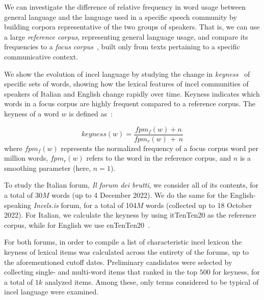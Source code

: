 \documentclass[11pt]{article}
\newcommand{\todoA}[1]{\todo[color=blue!40]{A: #1}}
\begin{document}

We can investigate the difference of relative frequency in word usage between general language and the language used in a specific speech community by building corpora representative of the two groups of speakers. That is, we can use a large \textit{reference corpus},
representing general language usage, and compare its frequencies to a \textit{focus corpus}~\cite{kilgarriff2009simple}, built only from texts pertaining to a specific communicative context.

We show the evolution of incel language by studying the change in
\textit{keyness}~\cite{kilgarriff2009simple}
of specific sets of words, showing how the lexical features of incel
communities of speakers of Italian and English
change rapidly over time.
Keyness indicates which words in a focus corpus are highly frequent compared to a reference corpus.
The keyness of a word $w$ is defined as~\cite{lexical_computing_2015}:%

\begin{equation}
keyness(w) = \frac{fpm_f(w) + n}
                {fpm_r(w)\, + \,n}
\end{equation}
%
where $fpm_f(w)$ represents the normalized frequency of a focus corpus word per million words, $fpm_r(w)$ refers to the word in the reference corpus, and $n$ is a smoothing parameter (here, $n=1$).

To study the Italian forum, \textit{Il forum dei brutti}, we consider all of its contents, for a total of 30$M$ words (up to 4 December 2022).
We do the same for the English-speaking \textit{Incels.is} forum, for a total of 104$M$ words (collected up to 18 October 2022).
For Italian, we calculate the keyness by using itTenTen20
as the reference corpus, while for English we use enTenTen20~\cite{tenten2013kilgarriff}.

For both forums, in order to compile a list of characteristic incel lexicon the keyness of lexical items was calculated across the entirety of the forums, up to the aforementioned cutoff dates. Preliminary candidates were selected by
collecting single- and multi-word items that ranked in the top $500$ for keyness, for a total of $1k$ analyzed items.  Among these, only terms considered to be typical of incel language were examined.
\end{document}
